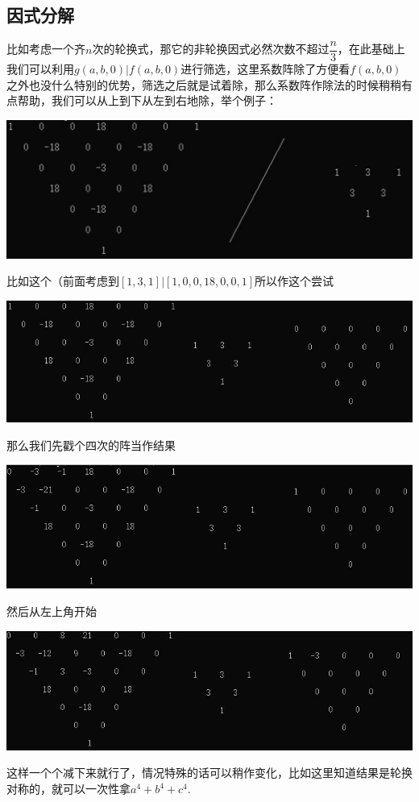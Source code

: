 \documentclass[UTF8]{ctexart}
\begin{document}
\subsection{因式分解}
比如考虑一个齐$ n $次的轮换式，那它的非轮换因式必然次数不超过$ \dfrac{n}{3} $，在此基础上我们可以利用$ g(a,b,0)|f(a,b,0) $进行筛选，这里系数阵除了方便看$ f(a,b,0) $之外也没什么特别的优势，筛选之后就是试着除，那么系数阵作除法的时候稍稍有点帮助，我们可以从上到下从左到右地除，举个例子：
\begin{center}
	\includegraphics[width=0.8\linewidth]{0290}
\end{center}
比如这个（前面考虑到$ [1,3,1]|[1,0,0,18,0,0,1] $所以作这个尝试
\begin{center}
	\includegraphics[width=0.8\linewidth]{0300}
\end{center}
那么我们先戳个四次的阵当作结果
\begin{center}
	\includegraphics[width=0.8\linewidth]{0310}
\end{center}
然后从左上角开始
\begin{center}
	\includegraphics[width=0.8\linewidth]{0320}
\end{center}
这样一个个减下来就行了，情况特殊的话可以稍作变化，比如这里知道结果是轮换对称的，就可以一次性拿$ a^4+b^4+c^4 $.
\end{document}
